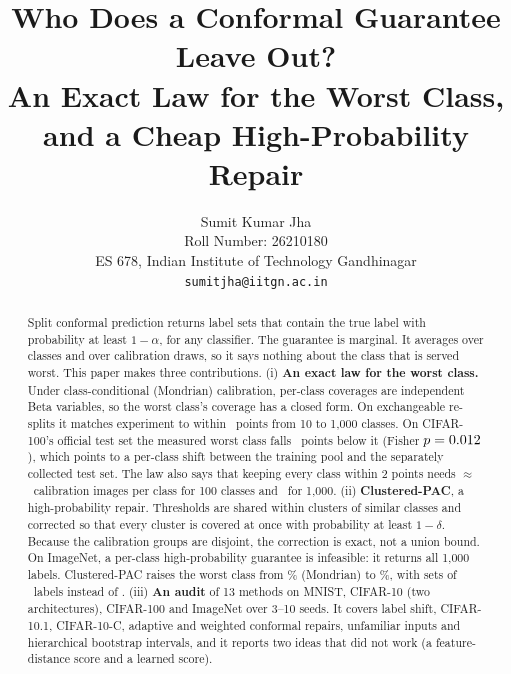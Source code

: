 \documentclass{article}
\title{Who Does a Conformal Guarantee Leave Out?\\ An Exact Law for the Worst Class, and a Cheap High-Probability Repair}
\author{%
  Sumit Kumar Jha \\
  Roll Number: 26210180 \\
  ES 678, Indian Institute of Technology Gandhinagar \\
  \texttt{sumitjha@iitgn.ac.in}
}
\begin{document}
\maketitle

\begin{abstract}
Split conformal prediction returns label sets that contain the true label with probability at least $1-\alpha$, for any
classifier. The guarantee is marginal. It averages over classes and over calibration draws, so it says nothing about the class that
is served worst. This paper makes three contributions. (i) \textbf{An exact law for the worst class.} Under class-conditional
(Mondrian) calibration, per-class coverages are independent Beta variables, so the worst class's coverage has a closed form. On
exchangeable re-splits it matches experiment to within \NsMaxErr\ points from 10 to 1{,}000 classes. On CIFAR-100's official test set
the measured worst class falls \MissPtsCHun\ points below it (Fisher $p=0.012$), which points to a per-class shift between the
training pool and the separately collected test set. The law also says that keeping every class within 2 points needs
$\approx$\NeedHun\ calibration images per class for 100 classes and \NeedThou\ for 1{,}000. (ii) \textbf{Clustered-PAC}, a
high-probability repair. Thresholds are shared within clusters of similar classes and corrected so that every cluster is covered at
once with probability at least $1-\delta$. Because the calibration groups are disjoint, the correction is exact, not a union bound. On
ImageNet, a per-class high-probability guarantee is infeasible: it returns all 1{,}000 labels. Clustered-PAC raises the worst class
from \WorstINetMond\% (Mondrian) to \WorstINetClusPAC\%, with sets of \SizeINetClusPAC\ labels instead of \SizeINetMond. (iii)
\textbf{An audit} of 13 methods on MNIST, CIFAR-10 (two architectures), CIFAR-100 and ImageNet over 3--10 seeds. It covers label shift,
CIFAR-10.1, CIFAR-10-C, adaptive and weighted conformal repairs, unfamiliar inputs and hierarchical bootstrap intervals, and it
reports two ideas that did not work (a feature-distance score and a learned score).
\end{abstract}

\end{document}

